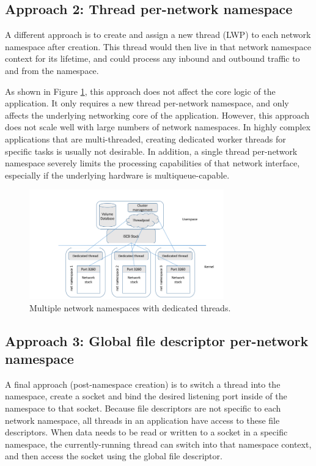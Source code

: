 \documentclass[letterpaper]{article}
\begin{document}
\subsection{Approach 2: Thread per-network namespace}
A different approach is to create and assign a new thread (LWP) to each network namespace after creation. This thread would then live in that network namespace context for its lifetime, and could process any inbound and outbound traffic to and from the namespace.

As shown in Figure \ref{namespace-threads}, this approach does not affect the core logic of the application. It only requires a new thread per-network namespace, and only affects the underlying networking core of the application. However, this approach does not scale well with large numbers of network namespaces. In highly complex applications that are multi-threaded, creating dedicated worker threads for specific tasks is usually not desirable. In addition, a single thread per-network namespace severely limits the processing capabilities of that network interface, especially if the underlying hardware is multiqueue-capable.

\begin{figure}[h]
\includegraphics[width=3.31in]{multiple-stacks-namespaces-dedicated-threads.png}
\caption{Multiple network namespaces with dedicated threads.}
\label{namespace-threads}
\end{figure}

\subsection{Approach 3: Global file descriptor per-network namespace}
A final approach (post-namespace creation) is to switch a thread into the namespace, create a socket and bind the desired listening port inside of the namespace to that socket. Because file descriptors are not specific to each network namespace, all threads in an application have access to these file descriptors. When data needs to be read or written to a socket in a specific namespace, the currently-running thread can switch into that namespace context, and then access the socket using the global file descriptor.
\end{document}
